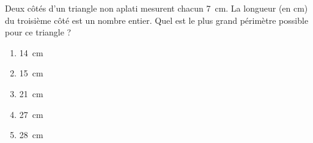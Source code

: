 Deux côtés d'un triangle non aplati mesurent chacun 7~cm. La longueur
(en cm) du troisième côté est un nombre entier. Quel est le plus grand
périmètre possible pour ce triangle ?
\begin{multicols}{5}
  \begin{enumerate}[A/]
  \item 14~cm
  \item 15~cm
  \item 21~cm
  \item 27~cm
  \item 28~cm
  \end{enumerate}
\end{multicols}